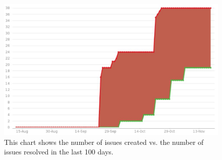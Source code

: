 \documentclass[a4paper,12pt]{book}
\begin{document}
{\begin{figure}[H]
  \centering
    \includegraphics[width=1.0\textwidth]{chart1}
    \caption{ This chart shows the number of issues created vs. the number of issues resolved in the last 100 days.~\cite{jiraboard}}
\end{figure}
    
}
\end{document}
